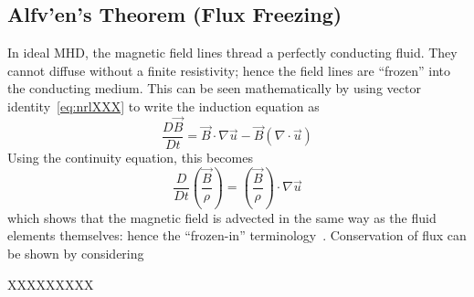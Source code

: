 \subsection{Alfv'en's Theorem (Flux Freezing)}
In ideal MHD, the magnetic field lines thread a perfectly conducting fluid. They cannot diffuse without a finite resistivity; hence the field lines are ``frozen'' into the conducting medium. This can be seen mathematically by using vector identity~\ref{eq:nrlXXX} to write the induction equation as
\begin{equation*}
  \frac{D\vec B}{Dt}=\vec B\cdot\nabla\vec u-\vec B(\nabla\cdot\vec u)
\end{equation*}
Using the continuity equation, this becomes
\begin{equation*}
  \frac{D}{Dt}\left(\frac{\vec B}{\rho}\right)=\left(\frac{\vec B}{\rho}\right)\cdot\nabla\vec u
\end{equation*}
which shows that the magnetic field is advected in the same way as the fluid elements themselves: hence the ``frozen-in'' terminology~\cite{Ogilvie2016}. Conservation of flux can be shown by considering


XXXXXXXXX
